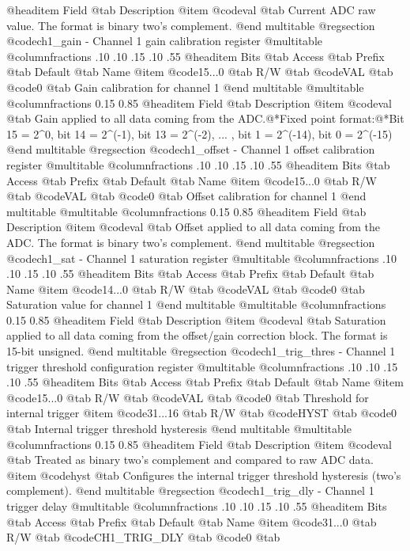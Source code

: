 @headitem Field @tab Description
@item @code{val} @tab Current ADC raw value. The format is binary two's complement.
@end multitable
@regsection @code{ch1_gain} - Channel 1 gain calibration register
@multitable @columnfractions .10 .10 .15 .10 .55
@headitem Bits @tab Access @tab Prefix @tab Default @tab Name
@item @code{15...0}
@tab R/W @tab
@code{VAL}
@tab @code{0} @tab 
Gain calibration for channel 1
@end multitable
@multitable @columnfractions 0.15 0.85
@headitem Field @tab Description
@item @code{val} @tab Gain applied to all data coming from the ADC.@*Fixed point format:@*Bit 15 = 2^0, bit 14 = 2^(-1), bit 13 = 2^(-2), ... , bit 1 = 2^(-14), bit 0 = 2^(-15)
@end multitable
@regsection @code{ch1_offset} - Channel 1 offset calibration register
@multitable @columnfractions .10 .10 .15 .10 .55
@headitem Bits @tab Access @tab Prefix @tab Default @tab Name
@item @code{15...0}
@tab R/W @tab
@code{VAL}
@tab @code{0} @tab 
Offset calibration for channel 1
@end multitable
@multitable @columnfractions 0.15 0.85
@headitem Field @tab Description
@item @code{val} @tab Offset applied to all data coming from the ADC. The format is binary two's complement.
@end multitable
@regsection @code{ch1_sat} - Channel 1 saturation register
@multitable @columnfractions .10 .10 .15 .10 .55
@headitem Bits @tab Access @tab Prefix @tab Default @tab Name
@item @code{14...0}
@tab R/W @tab
@code{VAL}
@tab @code{0} @tab 
Saturation value for channel 1
@end multitable
@multitable @columnfractions 0.15 0.85
@headitem Field @tab Description
@item @code{val} @tab Saturation applied to all data coming from the offset/gain correction block. The format is 15-bit unsigned.
@end multitable
@regsection @code{ch1_trig_thres} - Channel 1 trigger threshold configuration register
@multitable @columnfractions .10 .10 .15 .10 .55
@headitem Bits @tab Access @tab Prefix @tab Default @tab Name
@item @code{15...0}
@tab R/W @tab
@code{VAL}
@tab @code{0} @tab 
Threshold for internal trigger
@item @code{31...16}
@tab R/W @tab
@code{HYST}
@tab @code{0} @tab 
Internal trigger threshold hysteresis
@end multitable
@multitable @columnfractions 0.15 0.85
@headitem Field @tab Description
@item @code{val} @tab Treated as binary two's complement and compared to raw ADC data.
@item @code{hyst} @tab Configures the internal trigger threshold hysteresis (two's complement).
@end multitable
@regsection @code{ch1_trig_dly} - Channel 1 trigger delay
@multitable @columnfractions .10 .10 .15 .10 .55
@headitem Bits @tab Access @tab Prefix @tab Default @tab Name
@item @code{31...0}
@tab R/W @tab
@code{CH1_TRIG_DLY}
@tab @code{0} @tab 
